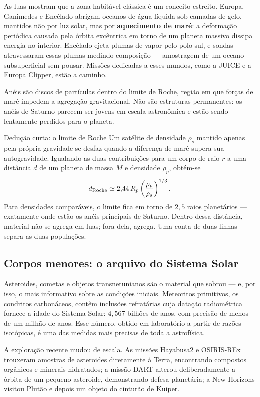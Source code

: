 \documentclass[11pt,a4paper]{article}
\begin{document}
As luas mostram que a zona habitável clássica é um conceito estreito. Europa, Ganimedes e Encélado abrigam oceanos de água líquida sob camadas de gelo, mantidos não por luz solar, mas por \textbf{aquecimento de maré}: a deformação periódica causada pela órbita excêntrica em torno de um planeta massivo dissipa energia no interior. Encélado ejeta plumas de vapor pelo polo sul, e sondas atravessaram essas plumas medindo composição --- amostragem de um oceano subsuperficial sem pousar. Missões dedicadas a esses mundos, como a JUICE e a Europa Clipper, estão a caminho.

Anéis são discos de partículas dentro do limite de Roche, região em que forças de maré impedem a agregação gravitacional. Não são estruturas permanentes: os anéis de Saturno parecem ser jovens em escala astronômica e estão sendo lentamente perdidos para o planeta.

\begin{lessonblock}[borderline west={2pt}{0pt}{astroGold}]{Dedução curta: o limite de Roche}
Um satélite de densidade $\rho_s$ mantido apenas pela própria gravidade se desfaz quando a diferença de maré supera sua autogravidade. Igualando as duas contribuições para um corpo de raio $r$ a uma distância $d$ de um planeta de massa $M$ e densidade $\rho_p$, obtém-se
\[
d_{\rm Roche}\simeq2{,}44\,R_p\left(\frac{\rho_p}{\rho_s}\right)^{1/3}.
\]
Para densidades comparáveis, o limite fica em torno de $2{,}5$ raios planetários --- exatamente onde estão os anéis principais de Saturno. Dentro dessa distância, material não se agrega em luas; fora dela, agrega. Uma conta de duas linhas separa as duas populações.
\end{lessonblock}

\subsection*{Corpos menores: o arquivo do Sistema Solar}

Asteroides, cometas e objetos transnetunianos são o material que sobrou --- e, por isso, o mais informativo sobre as condições iniciais. Meteoritos primitivos, os condritos carbonáceos, contêm inclusões refratárias cuja datação radiométrica fornece a idade do Sistema Solar: $4{,}567$ bilhões de anos, com precisão de menos de um milhão de anos. Esse número, obtido em laboratório a partir de razões isotópicas, é uma das medidas mais precisas de toda a astrofísica.

A exploração recente mudou de escala. As missões Hayabusa2 e OSIRIS-REx trouxeram amostras de asteroides diretamente à Terra, encontrando compostos orgânicos e minerais hidratados; a missão DART alterou deliberadamente a órbita de um pequeno asteroide, demonstrando defesa planetária; a New Horizons visitou Plutão e depois um objeto do cinturão de Kuiper.
\end{document}
